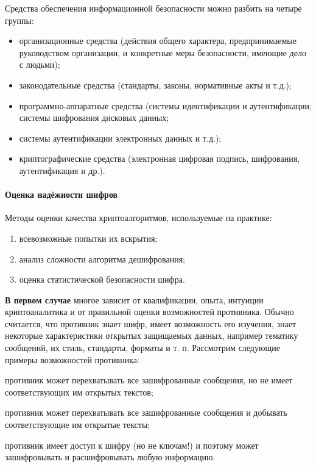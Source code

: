 \noindent Средства обеспечения информационной безопасности можно разбить на
четыре группы:
\begin{itemize}
  \item организационные средства (действия общего характера,
      предпринимаемые руководством организации, и конкретные меры
      безопасности, имеющие дело с людьми);
  \item законодательные средства (стандарты, законы, нормативные акты и
      т.д.);
  \item программно-аппаратные средства (системы идентификации и
      аутентификации; системы шифрования дисковых данных;
  \item системы аутентификации электронных данных и т.д.);
  \item криптографические средства (электронная цифровая подпись,
      шифрования, аутентификация и др.).
\end{itemize}

\paragraph{Оценка надёжности шифров}
Методы оценки качества криптоалгоритмов, используемые на практике:

\begin{enumerate}
  \item всевозможные попытки их вскрытия;
  \item анализ сложности алгоритма дешифрования;
  \item оценка статистической безопасности шифра.
\end{enumerate}

\noindent \textbf{В первом случае} многое зависит от квалификации, опыта,
интуиции криптоаналитика и от правильной оценки возможностей противника.
Обычно считается, что противник знает шифр, имеет возможность его изучения,
знает некоторые характеристики открытых защищаемых данных, например тематику
сообщений, их стиль, стандарты, форматы и т. п. Рассмотрим следующие примеры
возможностей противника:
\begin{Notes}
  \item противник может перехватывать все зашифрованные сообщения, но не
      имеет соответствующих им открытых текстов;
  \item противник может перехватывать все зашифрованные сообщения и
      добывать соответствующие им открытые тексты;
  \item противник имеет доступ к шифру (но не ключам!) и поэтому может
      зашифровывать и расшифровывать любую информацию.
\end{Notes}

